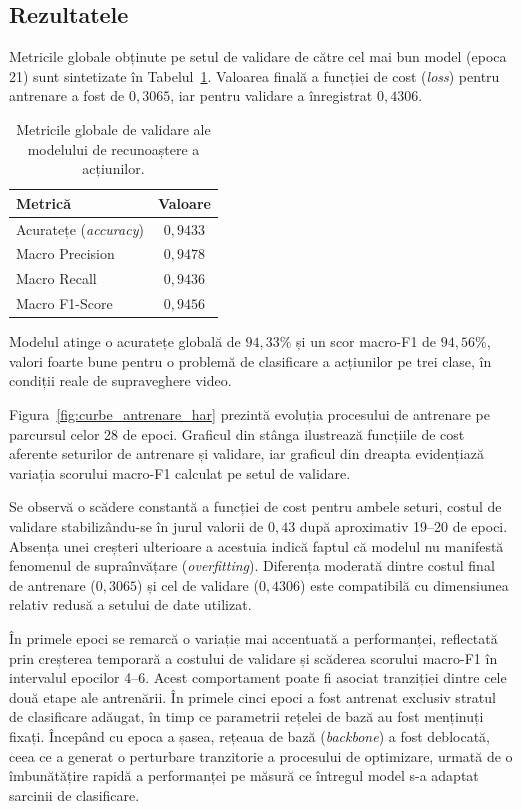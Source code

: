 \documentclass[../../main.tex]{subfiles}
\begin{document}
\subsection{Rezultatele}
\label{subsec:rezultate_actiuni}

Metricile globale obținute pe setul de validare de către cel mai bun model (epoca 21) sunt sintetizate în Tabelul~\ref{tab:rezultate_actiuni}. Valoarea finală a funcției de cost (\textit{loss}) pentru antrenare a fost de $0{,}3065$, iar pentru validare a înregistrat $0{,}4306$.

\begin{table}[h]
    \centering
    \caption{Metricile globale de validare ale modelului de recunoaștere a acțiunilor.}
    \label{tab:rezultate_actiuni}
    \begin{tabular}{l c}
        \hline
        \textbf{Metrică} & \textbf{Valoare} \\
        \hline
        Acuratețe (\textit{accuracy}) & $0{,}9433$ \\
        Macro Precision & $0{,}9478$ \\
        Macro Recall & $0{,}9436$ \\
        Macro F1-Score & $0{,}9456$ \\
        \hline
    \end{tabular}
\end{table}

Modelul atinge o acuratețe globală de $94{,}33\%$ și un scor macro-F1 de $94{,}56\%$, valori foarte bune pentru o problemă de clasificare a acțiunilor pe trei clase, în condiții reale de supraveghere video.

Figura~\ref{fig:curbe_antrenare_har} prezintă evoluția procesului de antrenare pe parcursul celor 28 de epoci. Graficul din stânga ilustrează funcțiile de cost aferente seturilor de antrenare și validare, iar graficul din dreapta evidențiază variația scorului macro-F1 calculat pe setul de validare.

Se observă o scădere constantă a funcției de cost pentru ambele seturi, costul de validare stabilizându-se în jurul valorii de $0{,}43$ după aproximativ 19–20 de epoci. Absența unei creșteri ulterioare a acestuia indică faptul că modelul nu manifestă fenomenul de supraînvățare (\textit{overfitting}). Diferența moderată dintre costul final de antrenare ($0{,}3065$) și cel de validare ($0{,}4306$) este compatibilă cu dimensiunea relativ redusă a setului de date utilizat.

În primele epoci se remarcă o variație mai accentuată a performanței, reflectată prin creșterea temporară a costului de validare și scăderea scorului macro-F1 în intervalul epocilor 4–6. Acest comportament poate fi asociat tranziției dintre cele două etape ale antrenării. În primele cinci epoci a fost antrenat exclusiv stratul de clasificare adăugat, în timp ce parametrii rețelei de bază au fost menținuți fixați. Începând cu epoca a șasea, rețeaua de bază (\textit{backbone}) a fost deblocată, ceea ce a generat o perturbare tranzitorie a procesului de optimizare, urmată de o îmbunătățire rapidă a performanței pe măsură ce întregul model s-a adaptat sarcinii de clasificare.
\end{document}

